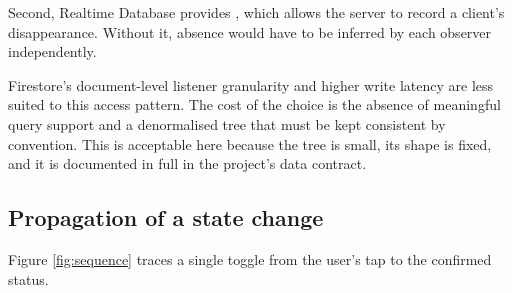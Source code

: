 \documentclass[11pt,a4paper]{article}
\begin{document}
Second, Realtime Database provides , which allows the
server to record a client's disappearance. Without it, absence would have to be
inferred by each observer independently.

Firestore's document-level listener granularity and higher write latency are
less suited to this access pattern. The cost of the choice is the absence of
meaningful query support and a denormalised tree that must be kept consistent by
convention. This is acceptable here because the tree is small, its shape is
fixed, and it is documented in full in the project's data contract.

\subsection{Propagation of a state change}

Figure \ref{fig:sequence} traces a single toggle from the user's tap to the
confirmed status.
\end{document}
